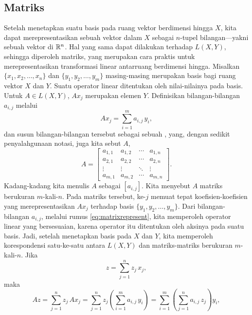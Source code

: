 \subsection{Matriks}

Setelah menetapkan suatu basis pada ruang vektor
berdimensi hingga $X$, kita dapat merepresentasikan sebuah vektor dalam $X$ sebagai
$n$-tupel bilangan---yakni sebuah vektor di ${\mathbb{R}}^n$.
Hal yang sama dapat dilakukan terhadap $L(X,Y)$, sehingga diperoleh matriks,
yang merupakan cara praktis untuk merepresentasikan
transformasi linear antarruang berdimensi hingga.
Misalkan $\{ x_1, x_2, \ldots, x_n \}$ dan $\{ y_1, y_2, \ldots, y_m \}$
masing-masing merupakan basis bagi ruang vektor $X$ dan $Y$.  Suatu operator linear 
ditentukan oleh nilai-nilainya pada basis.  Untuk $A \in L(X,Y)$,
$A x_j$ merupakan elemen $Y$.  Definisikan bilangan-bilangan
$a_{i,j}$ melalui
\begin{equation} \label{eq:matrixrepresent}
A x_j = \sum_{i=1}^m a_{i,j} \, y_i ,
\end{equation}
dan susun bilangan-bilangan tersebut sebagai sebuah \emph{},
yang, dengan sedikit penyalahgunaan notasi, juga kita sebut $A$,
\begin{equation*}
A =
\begin{bmatrix}
a_{1,1} & a_{1,2} & \cdots & a_{1,n} \\
a_{2,1} & a_{2,2} & \cdots & a_{2,n} \\
\vdots & \vdots & \ddots & \vdots \\
a_{m,1} & a_{m,2} & \cdots & a_{m,n}
\end{bmatrix} .
\end{equation*}
Kadang-kadang kita menulis $A$ sebagai $[a_{i,j}]$.
Kita menyebut $A$ matriks berukuran $m$-kali-$n$.
Pada matriks tersebut, \emph{} ke-$j$ memuat tepat koefisien-koefisien
yang merepresentasikan $A x_j$ terhadap basis $\{ y_1,y_2,\ldots,y_m \}$.
Dari bilangan-bilangan $a_{i,j}$, melalui rumus
\eqref{eq:matrixrepresent}, kita memperoleh operator linear yang bersesuaian,
karena operator itu ditentukan oleh aksinya pada suatu basis.  Jadi, setelah menetapkan
basis pada $X$ dan $Y$, kita memperoleh korespondensi satu-ke-satu antara
$L(X,Y)$ dan matriks-matriks berukuran $m$-kali-$n$.
Jika
\begin{equation*}
z = \sum_{j=1}^n z_j \, x_j ,
\end{equation*}
maka
\begin{equation*}
A z =
\sum_{j=1}^n z_j \, A x_j 
=
\sum_{j=1}^n z_j \left( \sum_{i=1}^m  a_{i,j}\, y_i \right) 
=
\sum_{i=1}^m \left(\sum_{j=1}^n  a_{i,j}\, z_j \right) y_i ,
\end{equation*}
